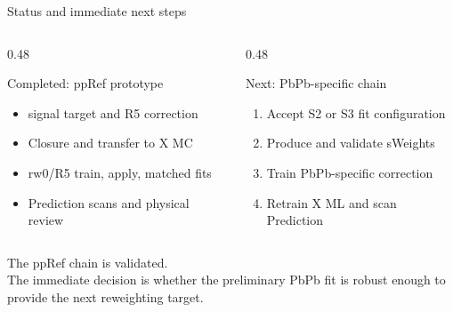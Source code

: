 \documentclass[11pt,aspectratio=169]{beamer}
\newcommand{\HL}[1]{\textcolor{emphasis}{#1}}
\begin{document}
\begin{frame}{Status and immediate next steps}
  \begin{columns}[T]
    \begin{column}{0.48\textwidth}
      \begin{exampleblock}{Completed: ppRef prototype}
        \begin{itemize}
          \item \psiP signal target and R5 correction
          \item Closure and transfer to X MC
          \item rw0/R5 train, apply, matched fits
          \item Prediction scans and physical review
        \end{itemize}
      \end{exampleblock}
    \end{column}
    \begin{column}{0.48\textwidth}
      \begin{block}{Next: PbPb-specific chain}
        \begin{enumerate}
          \item Accept S2 or S3 fit configuration
          \item Produce and validate sWeights
          \item Train PbPb-specific correction
          \item Retrain X ML and scan Prediction
        \end{enumerate}
      \end{block}
    \end{column}
  \end{columns}
  \vfill
  \begin{center}
    \Large\HL{The ppRef chain is validated.}\\[0.4em]
    \normalsize
    The immediate decision is whether the preliminary PbPb \psiP fit is robust enough
    to provide the next reweighting target.
  \end{center}
\end{frame}
\end{document}
